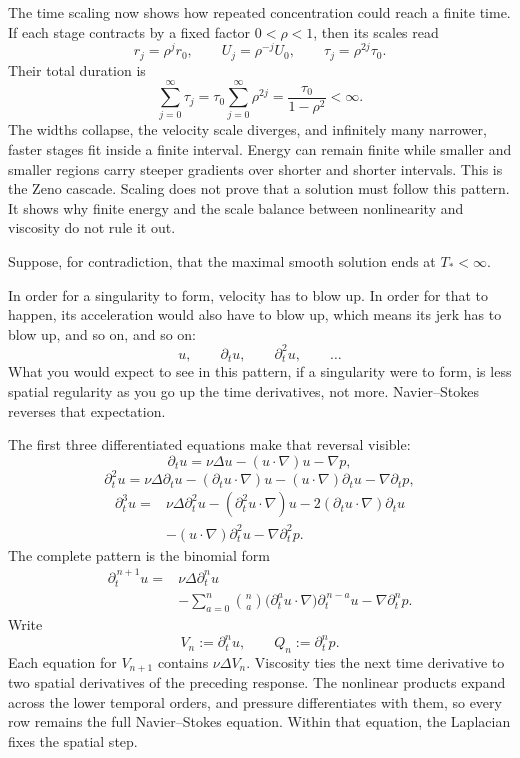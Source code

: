 \documentclass[11pt]{article}
\begin{document}
The time scaling now shows how repeated concentration could reach a finite time. If each stage contracts by a fixed factor \(0<\rho<1\), then its scales read
\[
r_j=\rho^jr_0,
\qquad
U_j=\rho^{-j}U_0,
\qquad
\tau_j=\rho^{2j}\tau_0.
\]
Their total duration is
\[
\sum_{j=0}^{\infty}\tau_j
=\tau_0\sum_{j=0}^{\infty}\rho^{2j}
=\frac{\tau_0}{1-\rho^2}<\infty.
\]
The widths collapse, the velocity scale diverges, and infinitely many narrower, faster stages fit inside a finite interval. Energy can remain finite while smaller and smaller regions carry steeper gradients over shorter and shorter intervals. This is the Zeno cascade. Scaling does not prove that a solution must follow this pattern. It shows why finite energy and the scale balance between nonlinearity and viscosity do not rule it out.

Suppose, for contradiction, that the maximal smooth solution ends at \(T_*<\infty\).

In order for a singularity to form, velocity has to blow up. In order for that to happen, its acceleration would also have to blow up, which means its jerk has to blow up, and so on, and so on:
\[
u,\qquad \partial_tu,\qquad \partial_t^2u,\qquad \ldots
\]
What you would expect to see in this pattern, if a singularity were to form, is less spatial regularity as you go up the time derivatives, not more. Navier--Stokes reverses that expectation.

The first three differentiated equations make that reversal visible:
\[
\partial_tu
=\nu\Delta u-(u\cdot\nabla)u-\nabla p,
\]
\[
\partial_t^2u
=\nu\Delta\partial_tu
-(\partial_tu\cdot\nabla)u
-(u\cdot\nabla)\partial_tu
-\nabla\partial_tp,
\]
\[
\begin{aligned}
\partial_t^3u={}&\nu\Delta\partial_t^2u
-(\partial_t^2u\cdot\nabla)u
-2(\partial_tu\cdot\nabla)\partial_tu \\
&-(u\cdot\nabla)\partial_t^2u
-\nabla\partial_t^2p.
\end{aligned}
\]
The complete pattern is the binomial form
\[
\begin{aligned}
\partial_t^{\,n+1}u={}&\nu\Delta\partial_t^n u \\
&-\sum_{a=0}^{n}\binom{n}{a}
\bigl(\partial_t^a u\cdot\nabla\bigr)
\partial_t^{\,n-a}u
-\nabla\partial_t^n p.
\end{aligned}
\]
Write
\[
V_n:=\partial_t^n u,
\qquad
Q_n:=\partial_t^n p.
\]
Each equation for \(V_{n+1}\) contains \(\nu\Delta V_n\). Viscosity ties the next time derivative to two spatial derivatives of the preceding response. The nonlinear products expand across the lower temporal orders, and pressure differentiates with them, so every row remains the full Navier--Stokes equation. Within that equation, the Laplacian fixes the spatial step.
\end{document}

